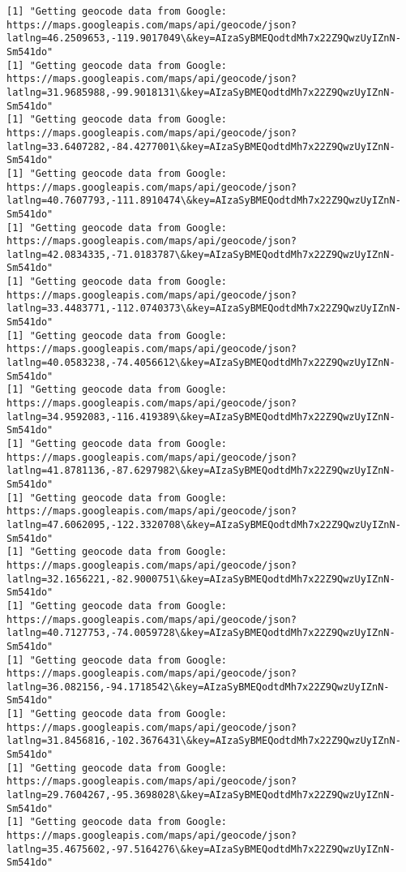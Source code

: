 \documentclass[11pt]{article}
\begin{document}
\begin{Verbatim}[commandchars=\\\{\}]
[1] "Getting geocode data from Google: https://maps.googleapis.com/maps/api/geocode/json?latlng=46.2509653,-119.9017049\&key=AIzaSyBMEQodtdMh7x22Z9QwzUyIZnN-Sm541do"
[1] "Getting geocode data from Google: https://maps.googleapis.com/maps/api/geocode/json?latlng=31.9685988,-99.9018131\&key=AIzaSyBMEQodtdMh7x22Z9QwzUyIZnN-Sm541do"
[1] "Getting geocode data from Google: https://maps.googleapis.com/maps/api/geocode/json?latlng=33.6407282,-84.4277001\&key=AIzaSyBMEQodtdMh7x22Z9QwzUyIZnN-Sm541do"
[1] "Getting geocode data from Google: https://maps.googleapis.com/maps/api/geocode/json?latlng=40.7607793,-111.8910474\&key=AIzaSyBMEQodtdMh7x22Z9QwzUyIZnN-Sm541do"
[1] "Getting geocode data from Google: https://maps.googleapis.com/maps/api/geocode/json?latlng=42.0834335,-71.0183787\&key=AIzaSyBMEQodtdMh7x22Z9QwzUyIZnN-Sm541do"
[1] "Getting geocode data from Google: https://maps.googleapis.com/maps/api/geocode/json?latlng=33.4483771,-112.0740373\&key=AIzaSyBMEQodtdMh7x22Z9QwzUyIZnN-Sm541do"
[1] "Getting geocode data from Google: https://maps.googleapis.com/maps/api/geocode/json?latlng=40.0583238,-74.4056612\&key=AIzaSyBMEQodtdMh7x22Z9QwzUyIZnN-Sm541do"
[1] "Getting geocode data from Google: https://maps.googleapis.com/maps/api/geocode/json?latlng=34.9592083,-116.419389\&key=AIzaSyBMEQodtdMh7x22Z9QwzUyIZnN-Sm541do"
[1] "Getting geocode data from Google: https://maps.googleapis.com/maps/api/geocode/json?latlng=41.8781136,-87.6297982\&key=AIzaSyBMEQodtdMh7x22Z9QwzUyIZnN-Sm541do"
[1] "Getting geocode data from Google: https://maps.googleapis.com/maps/api/geocode/json?latlng=47.6062095,-122.3320708\&key=AIzaSyBMEQodtdMh7x22Z9QwzUyIZnN-Sm541do"
[1] "Getting geocode data from Google: https://maps.googleapis.com/maps/api/geocode/json?latlng=32.1656221,-82.9000751\&key=AIzaSyBMEQodtdMh7x22Z9QwzUyIZnN-Sm541do"
[1] "Getting geocode data from Google: https://maps.googleapis.com/maps/api/geocode/json?latlng=40.7127753,-74.0059728\&key=AIzaSyBMEQodtdMh7x22Z9QwzUyIZnN-Sm541do"
[1] "Getting geocode data from Google: https://maps.googleapis.com/maps/api/geocode/json?latlng=36.082156,-94.1718542\&key=AIzaSyBMEQodtdMh7x22Z9QwzUyIZnN-Sm541do"
[1] "Getting geocode data from Google: https://maps.googleapis.com/maps/api/geocode/json?latlng=31.8456816,-102.3676431\&key=AIzaSyBMEQodtdMh7x22Z9QwzUyIZnN-Sm541do"
[1] "Getting geocode data from Google: https://maps.googleapis.com/maps/api/geocode/json?latlng=29.7604267,-95.3698028\&key=AIzaSyBMEQodtdMh7x22Z9QwzUyIZnN-Sm541do"
[1] "Getting geocode data from Google: https://maps.googleapis.com/maps/api/geocode/json?latlng=35.4675602,-97.5164276\&key=AIzaSyBMEQodtdMh7x22Z9QwzUyIZnN-Sm541do"

\end{Verbatim}
\end{document}
